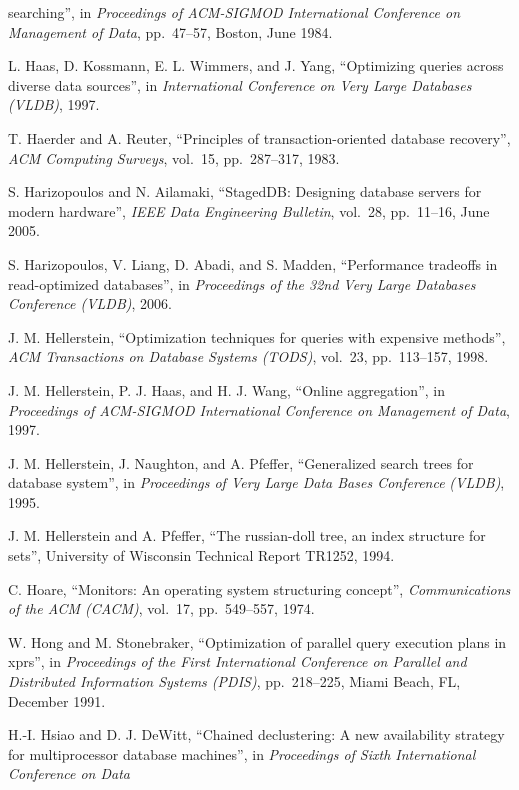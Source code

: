 \documentclass[b5paper,11pt,twoside,openright]{book}
\begin{document}
\begin{enumerate}[label={[\arabic*]}]
  searching'', in \emph{Proceedings of ACM-SIGMOD International
  Conference on Management of Data}, pp.~47--57, Boston, June 1984.
\item
  L. Haas, D. Kossmann, E. L. Wimmers, and J. Yang, ``Optimizing queries
  across diverse data sources'', in \emph{International Conference on
  Very Large Databases} \emph{(VLDB)}, 1997.
\item
  T. Haerder and A. Reuter, ``Principles of transaction-oriented
  database recovery'', \emph{ACM Computing Surveys}, vol.~15,
  pp.~287--317, 1983.
\item
  S. Harizopoulos and N. Ailamaki, ``StagedDB: Designing database
  servers for modern hardware'', \emph{IEEE Data Engineering Bulletin},
  vol.~28, pp.~11--16, June 2005.
\item
  S. Harizopoulos, V. Liang, D. Abadi, and S. Madden, ``Performance
  tradeoffs in read-optimized databases'', in \emph{Proceedings of the
  32nd Very Large Databases} \emph{Conference (VLDB)}, 2006.
\item
  J. M. Hellerstein, ``Optimization techniques for queries with
  expensive methods'', \emph{ACM Transactions on Database Systems
  (TODS)}, vol.~23, pp.~113--157, 1998.
\item
  J. M. Hellerstein, P. J. Haas, and H. J. Wang, ``Online aggregation'',
  in \emph{Proceedings of ACM-SIGMOD International Conference on
  Management of Data}, 1997.
\item
  J. M. Hellerstein, J. Naughton, and A. Pfeffer, ``Generalized search
  trees for database system'', in \emph{Proceedings of Very Large Data
  Bases Conference} \emph{(VLDB)}, 1995.
\item
  J. M. Hellerstein and A. Pfeffer, ``The russian-doll tree, an index
  structure for sets'', University of Wisconsin Technical Report TR1252,
  1994.
\item
  C. Hoare, ``Monitors: An operating system structuring concept'',
  \emph{Communications of the ACM (CACM)}, vol.~17, pp.~549--557, 1974.
\item
  W. Hong and M. Stonebraker, ``Optimization of parallel query execution
  plans in xprs'', in \emph{Proceedings of the First International
  Conference on Parallel} \emph{and Distributed Information Systems
  (PDIS)}, pp.~218--225, Miami Beach, FL, December 1991.
\item
  H.-I. Hsiao and D. J. DeWitt, ``Chained declustering: A new
  availability strategy for multiprocessor database machines'', in
  \emph{Proceedings of Sixth International Conference on Data
}
\end{enumerate}
\end{document}
